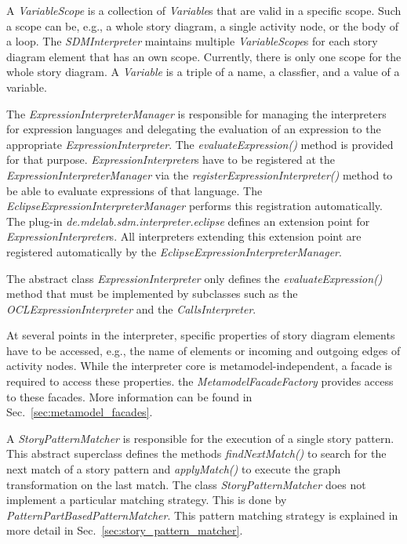 
A \emph{VariableScope} is a collection of \emph{Variable}s that are valid in a specific scope. Such a scope can be, e.g., a whole story diagram, a single activity node, or the body of a loop. The \emph{SDMInterpreter} maintains multiple \emph{VariableScope}s for each story diagram element that has an own scope. Currently, there is only one scope for the whole story diagram. A \emph{Variable} is a triple of a name, a classfier, and a value of a variable.

The \emph{ExpressionInterpreterManager} is responsible for managing the interpreters for expression languages and delegating the evaluation of an expression to the appropriate \emph{ExpressionInterpreter}. The \emph{evaluateExpression()} method is provided for that purpose. \emph{ExpressionInterpreter}s have to be registered at the \emph{ExpressionInterpreterManager} via the \emph{registerExpressionInterpreter()} method to be able to evaluate expressions of that language. The \emph{EclipseExpressionInterpreterManager} performs this registration automatically. The plug-in \emph{de.mdelab.sdm.interpreter.eclipse} defines an extension point for \emph{ExpressionInterpreter}s. All interpreters extending this extension point are registered automatically by the \emph{EclipseExpressionInterpreterManager}.

The abstract class \emph{ExpressionInterpreter} only defines the \emph{evaluateExpression()} method that must be implemented by subclasses such as the \emph{OCLExpressionInterpreter} and the \emph{CallsInterpreter}.

At several points in the interpreter, specific properties of story diagram elements have to be accessed, e.g., the name of elements or incoming and outgoing edges of activity nodes. While the interpreter core is metamodel-independent, a facade is required to access these properties. the \emph{MetamodelFacadeFactory} provides access to these facades. More information can be found in Sec.~\ref{sec:metamodel_facades}.

A \emph{StoryPatternMatcher} is responsible for the execution of a single story pattern. This abstract superclass defines the methods \emph{findNextMatch()} to search for the next match of a story pattern and \emph{applyMatch()} to execute the graph transformation on the last match. The class \emph{StoryPatternMatcher} does not implement a particular matching strategy. This is done by \emph{PatternPartBasedPatternMatcher}. This pattern matching strategy is explained in more detail in Sec.~\ref{sec:story_pattern_matcher}. 


